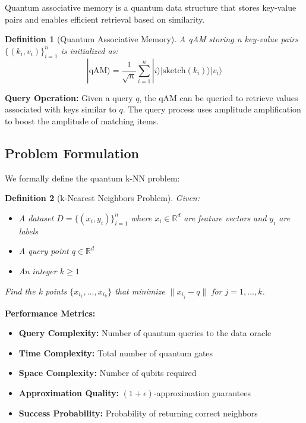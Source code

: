 \documentclass[11pt]{article}
\newtheorem{definition}{Definition}
\begin{document}
Quantum associative memory \cite{giovannetti2008quantum} is a quantum data structure that stores key-value pairs and enables efficient retrieval based on similarity.

\begin{definition}[Quantum Associative Memory]
A qAM storing n key-value pairs $\{(k_i, v_i)\}_{i=1}^n$ is initialized as:
\begin{equation}
|\text{qAM}\rangle = \frac{1}{\sqrt{n}} \sum_{i=1}^n |i\rangle |\text{sketch}(k_i)\rangle |v_i\rangle
\end{equation}
\end{definition}

\textbf{Query Operation:} Given a query $q$, the qAM can be queried to retrieve values associated with keys similar to $q$. The query process uses amplitude amplification to boost the amplitude of matching items.

\subsection{Problem Formulation}

We formally define the quantum k-NN problem:

\begin{definition}[k-Nearest Neighbors Problem]
Given:
\begin{itemize}
    \item A dataset $D = \{(x_i, y_i)\}_{i=1}^n$ where $x_i \in \mathbb{R}^d$ are feature vectors and $y_i$ are labels
    \item A query point $q \in \mathbb{R}^d$
    \item An integer $k \geq 1$
\end{itemize}
Find the k points $\{x_{i_1}, \ldots, x_{i_k}\}$ that minimize $\|x_{i_j} - q\|$ for $j = 1, \ldots, k$.
\end{definition}

\textbf{Performance Metrics:}
\begin{itemize}
    \item \textbf{Query Complexity:} Number of quantum queries to the data oracle
    \item \textbf{Time Complexity:} Total number of quantum gates
    \item \textbf{Space Complexity:} Number of qubits required
    \item \textbf{Approximation Quality:} $(1+\epsilon)$-approximation guarantees
    \item \textbf{Success Probability:} Probability of returning correct neighbors
\end{itemize}
\end{document}
